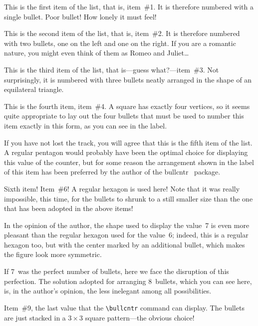 \documentclass[a4paper]{article}
\DeclareRobustCommand*{\packlass}[1]{%
	{\texorpdfstring{\normalfont \sffamily}{}#1}%
}
\newcommand*{\Bullcntr}{bullcntr}
\newcommand*{\bull}{\packlass{\Bullcntr}}
\newcommand*{\tbull}{the \bull\ package}
\begin{document}
\begin{bullenum}
	\renewcommand*{\counterlargebullet}{\textperiodcentered}
	\renewcommand*{\countersmallbullet}{\textperiodcentered}

	\item
		This is the first item of the list, that is, item~\#1.  It is
		therefore numbered with a single bullet.  Poor bullet!  How
		lonely it must feel!

	\item
		This is the second item of the list, that is, item~\#2.  It is
		therefore numbered with two bullets, one on the left and one
		on the right.  If you are a romantic nature, you might even
		think of them as Romeo and Juliet\ldots

	\item
		This is the third item of the list, that is---guess
		what?---item~\#3.  Not surprisingly, it is numbered with three
		bullets neatly arranged in the shape of an equilateral
		triangle.

	\item
		This is the fourth item, item~\#4.  A square has exactly four
		vertices, so it seems quite appropriate to lay out the four
		bullets that must be used to number this item exactly in this
		form, as you can see in the label.

	\item
		If you have not lost the track, you will agree that this is
		the fifth item of the list.  A regular pentagon would probably
		have been the optimal choice for displaying this value of the
		counter, but for some reason the arrangement shown in the
		label of this item has been preferred by the author of \tbull.

	\item
		Sixth item!  Item~\#6!  A regular hexagon is used here!  Note
		that it was really impossible, this time, for the bullets to
		shrunk to a still smaller size than the one that has been
		adopted in the above items!

	\item
		In the opinion of the author, the shape used to display the
		value~7 is even more pleasant than the regular hexagon used
		for the value~6; indeed, this is a regular hexagon too, but
		with the center marked by an additional bullet, which makes
		the figure look more symmetric.

	\item
		If 7~was the perfect number of bullets, here we face the
		disruption of this perfection.  The solution adopted for
		arranging 8~bullets, which you can see here, is, in the
		author's opinion, the less inelegant among all possibilities.

	\item
		Item~\#9, the last value that the \verb|\bullcntr| command can
		display.  The bullets are just stacked in a $3\times3$ square
		pattern---the obvious choice!
\end{bullenum}
\end{document}

